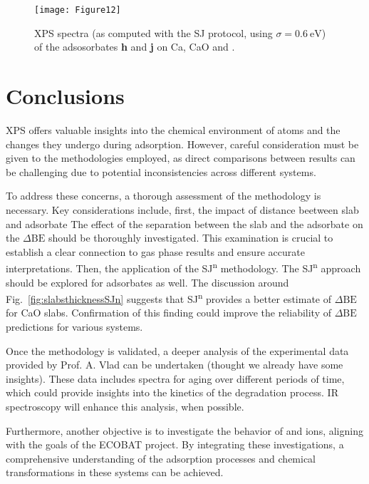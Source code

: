 \documentclass[12pt,a4paper]{article}
\def\dbe{\ensuremath{\Delta\text{BE}}}
\begin{document}
\begin{figure}[!h]
	\centering
	\texttt{[image: Figure12]}
	\caption{XPS spectra (as computed with the SJ protocol, using $\sigma=\SI{0.6}{\electronvolt}$) of the adsosorbates \textbf{h} and \textbf{j} on Ca, CaO and .}
	\label{fig:poss}
\end{figure}

\clearpage
\section{Conclusions}
XPS offers valuable insights into the chemical environment of atoms and the changes they undergo during adsorption. However, careful consideration must be given to the methodologies employed, as direct comparisons between results can be challenging due to potential inconsistencies across different systems.

To address these concerns, a thorough assessment of the methodology is necessary. Key considerations include, first, the impact of distance beetween slab and adsorbate The effect of the separation between the slab and the adsorbate on the \dbe{} should be thoroughly investigated. This examination is crucial to establish a clear connection to gas phase results and ensure accurate interpretations.
Then, the application of the SJ\textsuperscript{n} methodology. The SJ\textsuperscript{n} approach should be explored for adsorbates as well. The discussion around Fig.~\ref{fig:slabsthicknessSJn} suggests that SJ\textsuperscript{n} provides a better estimate of \dbe{} for CaO slabs. Confirmation of this finding could improve the reliability of \dbe{} predictions for various systems.

Once the methodology is validated, a deeper analysis of the experimental data provided by Prof. A. Vlad can be undertaken (thought we already have some insights). These data includes spectra for aging over different periods of time, which could provide insights into the kinetics of the degradation process. IR spectroscopy will enhance this analysis, when possible.

Furthermore, another objective is to investigate the behavior of  and  ions, aligning with the goals of the ECOBAT project. By integrating these investigations, a comprehensive understanding of the adsorption processes and chemical transformations in these systems can be achieved.


\clearpage


\end{document}
